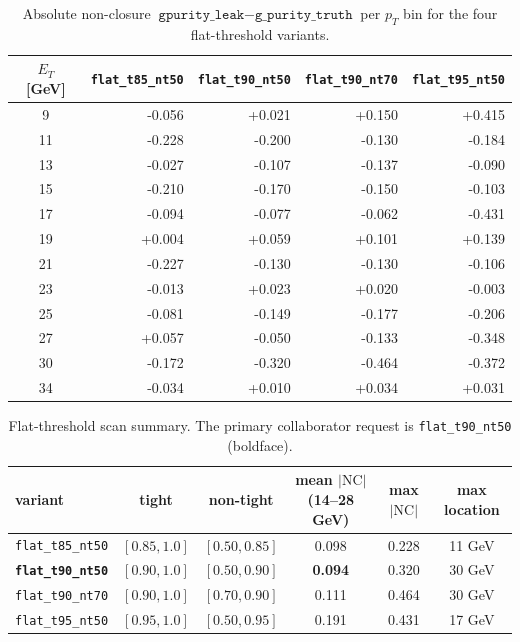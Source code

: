 \documentclass[11pt]{article}
\begin{document}
\begin{table}[ht]
  \centering
  \small
  \caption{Absolute non-closure $\texttt{gpurity\_leak} - \texttt{g\_purity\_truth}$ per $p_T$ bin for the four flat-threshold variants.}
  \label{tab:flat_nc_abs}
  \renewcommand{\arraystretch}{0.95}
  \begin{tabular}{c r r r r}
    \toprule
    $E_T$ [GeV] & \texttt{flat\_t85\_nt50} & \texttt{flat\_t90\_nt50} & \texttt{flat\_t90\_nt70} & \texttt{flat\_t95\_nt50} \\
    \midrule
    9  & -0.056 & +0.021 & +0.150 & +0.415 \\
    11 & -0.228 & -0.200 & -0.130 & -0.184 \\
    13 & -0.027 & -0.107 & -0.137 & -0.090 \\
    15 & -0.210 & -0.170 & -0.150 & -0.103 \\
    17 & -0.094 & -0.077 & -0.062 & -0.431 \\
    19 & +0.004 & +0.059 & +0.101 & +0.139 \\
    21 & -0.227 & -0.130 & -0.130 & -0.106 \\
    23 & -0.013 & +0.023 & +0.020 & -0.003 \\
    25 & -0.081 & -0.149 & -0.177 & -0.206 \\
    27 & +0.057 & -0.050 & -0.133 & -0.348 \\
    30 & -0.172 & -0.320 & -0.464 & -0.372 \\
    34 & -0.034 & +0.010 & +0.034 & +0.031 \\
    \bottomrule
  \end{tabular}
\end{table}

\begin{table}[ht]
  \centering
  \small
  \caption{Flat-threshold scan summary. The primary collaborator request is \texttt{flat\_t90\_nt50} (boldface).}
  \label{tab:flat_summary}
  \renewcommand{\arraystretch}{1.1}
  \begin{tabular}{l c c c c c}
    \toprule
    variant & tight & non-tight & mean $|\mathrm{NC}|$ (14--28 GeV) & max $|\mathrm{NC}|$ & max location \\
    \midrule
    \texttt{flat\_t85\_nt50}          & $[0.85, 1.0]$ & $[0.50, 0.85]$ & 0.098 & 0.228 & 11 GeV \\
    \textbf{\texttt{flat\_t90\_nt50}} & $[0.90, 1.0]$ & $[0.50, 0.90]$ & \textbf{0.094} & 0.320 & 30 GeV \\
    \texttt{flat\_t90\_nt70}          & $[0.90, 1.0]$ & $[0.70, 0.90]$ & 0.111 & 0.464 & 30 GeV \\
    \texttt{flat\_t95\_nt50}          & $[0.95, 1.0]$ & $[0.50, 0.95]$ & 0.191 & 0.431 & 17 GeV \\
    \bottomrule
  \end{tabular}
\end{table}
\end{document}
